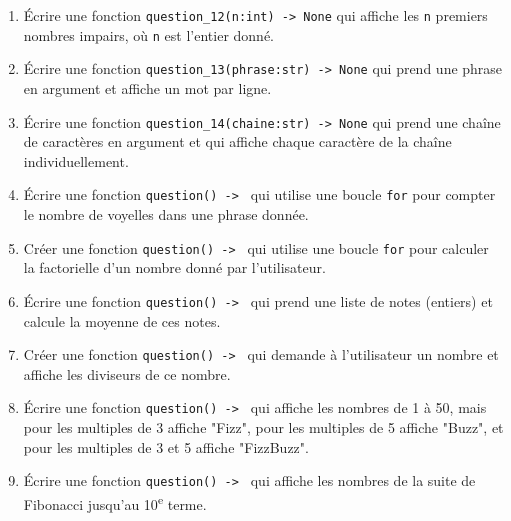 \begin{enumerate}
    \item Écrire une fonction \lstinline{question_12(n:int) -> None} qui affiche les \lstinline{n} premiers nombres impairs, où \lstinline{n} est l'entier donné.

    \item Écrire une fonction \lstinline{question_13(phrase:str) -> None} qui prend une phrase en argument et affiche un mot par ligne.

    \item Écrire une fonction \lstinline{question_14(chaine:str) -> None} qui prend une chaîne de caractères en argument et qui affiche chaque caractère de la chaîne individuellement.

    \item Écrire une fonction \lstinline{question() -> } qui utilise une boucle \lstinline{for} pour compter le nombre de voyelles dans une phrase donnée.

    \item Créer une fonction \lstinline{question() -> } qui utilise une boucle \lstinline{for} pour calculer la factorielle d'un nombre donné par l'utilisateur.

    \item Écrire une fonction \lstinline{question() -> } qui prend une liste de notes (entiers) et calcule la moyenne de ces notes.

    \item Créer une fonction \lstinline{question() -> } qui demande à l'utilisateur un nombre et affiche les diviseurs de ce nombre.

    \item Écrire une fonction \lstinline{question() -> } qui affiche les nombres de 1 à 50, mais pour les multiples de 3 affiche "Fizz", pour les multiples de 5 affiche "Buzz", et pour les multiples de 3 et 5 affiche "FizzBuzz".

    \item Écrire une fonction \lstinline{question() -> } qui affiche les nombres de la suite de Fibonacci jusqu'au 10\textsuperscript{e} terme.

\end{enumerate}

